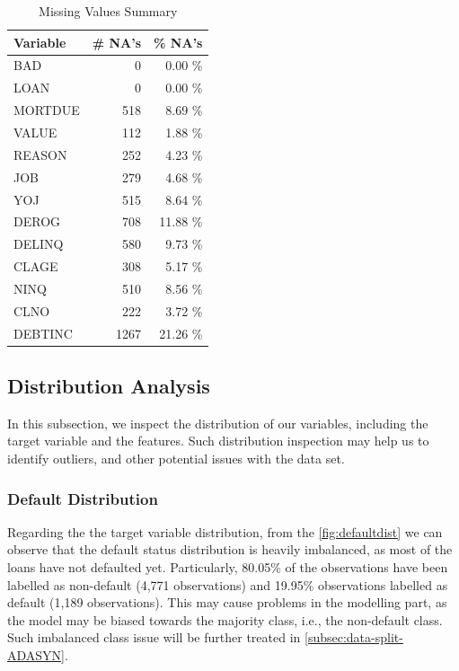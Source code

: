 \begin{table}[H]
\small
\setlength{\tabcolsep}{8pt}
\renewcommand{\arraystretch}{1.3}
\centering
\caption[Missing Values Summary]{Missing Values Summary}\label{tab:natable}
\begin{tabular}{l r r}
\toprule
\textbf{Variable} & \textbf{\# NA's} & \textbf{\% NA's}\\
\midrule
\hline
BAD & 0 & 0.00 \% \\
LOAN & 0 & 0.00 \% \\
MORTDUE & 518 & 8.69 \% \\
VALUE & 112 & 1.88 \% \\
REASON & 252 & 4.23 \% \\
JOB & 279 & 4.68 \% \\
YOJ & 515 & 8.64 \% \\
DEROG & 708 & 11.88 \% \\
DELINQ & 580 & 9.73 \% \\
CLAGE & 308 & 5.17 \% \\
NINQ & 510 & 8.56 \% \\
CLNO & 222 & 3.72 \% \\
DEBTINC & 1267 & 21.26 \% \\
\hline
\bottomrule
\end{tabular}
\vspace{0.35em}

\vspace{-1em}
\end{table}


\subsection{Distribution Analysis}
\label{subsec:distribution}
In this subsection, we inspect the distribution of our variables, including the target variable and the features.
Such distribution inspection may help us to identify outliers, and other potential issues with the data set.

\subsubsection{Default Distribution}

Regarding the the target variable distribution, from the \autoref{fig:defaultdist} we can observe that the default status distribution is heavily imbalanced, as most of the loans have not defaulted yet.
Particularly, 80.05\% of the observations have been labelled as non-default (4,771 observations) and 19.95\% observations labelled as default (1,189 observations).
This may cause problems in the modelling part, as the model may be biased towards the majority class, i.e., the non-default class. Such imbalanced class issue will be further treated in \autoref{subsec:data-split-ADASYN}.

